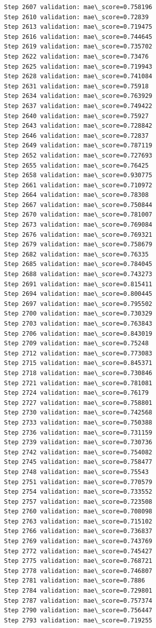 \documentclass[11pt]{article}
\begin{document}
\begin{Verbatim}[commandchars=\\\{\}]
Step 2607 validation: mae\_score=0.758196
Step 2610 validation: mae\_score=0.72839
Step 2613 validation: mae\_score=0.719475
Step 2616 validation: mae\_score=0.744645
Step 2619 validation: mae\_score=0.735702
Step 2622 validation: mae\_score=0.73476
Step 2625 validation: mae\_score=0.719943
Step 2628 validation: mae\_score=0.741084
Step 2631 validation: mae\_score=0.75918
Step 2634 validation: mae\_score=0.763929
Step 2637 validation: mae\_score=0.749422
Step 2640 validation: mae\_score=0.75927
Step 2643 validation: mae\_score=0.728842
Step 2646 validation: mae\_score=0.72837
Step 2649 validation: mae\_score=0.787119
Step 2652 validation: mae\_score=0.727693
Step 2655 validation: mae\_score=0.76425
Step 2658 validation: mae\_score=0.930775
Step 2661 validation: mae\_score=0.710972
Step 2664 validation: mae\_score=0.78308
Step 2667 validation: mae\_score=0.750844
Step 2670 validation: mae\_score=0.781007
Step 2673 validation: mae\_score=0.769084
Step 2676 validation: mae\_score=0.769321
Step 2679 validation: mae\_score=0.758679
Step 2682 validation: mae\_score=0.76335
Step 2685 validation: mae\_score=0.784045
Step 2688 validation: mae\_score=0.743273
Step 2691 validation: mae\_score=0.815411
Step 2694 validation: mae\_score=0.800445
Step 2697 validation: mae\_score=0.795502
Step 2700 validation: mae\_score=0.730329
Step 2703 validation: mae\_score=0.763843
Step 2706 validation: mae\_score=0.843019
Step 2709 validation: mae\_score=0.75248
Step 2712 validation: mae\_score=0.773083
Step 2715 validation: mae\_score=0.845371
Step 2718 validation: mae\_score=0.730846
Step 2721 validation: mae\_score=0.781081
Step 2724 validation: mae\_score=0.76179
Step 2727 validation: mae\_score=0.758801
Step 2730 validation: mae\_score=0.742568
Step 2733 validation: mae\_score=0.750388
Step 2736 validation: mae\_score=0.731159
Step 2739 validation: mae\_score=0.730736
Step 2742 validation: mae\_score=0.754082
Step 2745 validation: mae\_score=0.758477
Step 2748 validation: mae\_score=0.75543
Step 2751 validation: mae\_score=0.770579
Step 2754 validation: mae\_score=0.733552
Step 2757 validation: mae\_score=0.723508
Step 2760 validation: mae\_score=0.708098
Step 2763 validation: mae\_score=0.715102
Step 2766 validation: mae\_score=0.736837
Step 2769 validation: mae\_score=0.743769
Step 2772 validation: mae\_score=0.745427
Step 2775 validation: mae\_score=0.768721
Step 2778 validation: mae\_score=0.746807
Step 2781 validation: mae\_score=0.7886
Step 2784 validation: mae\_score=0.729801
Step 2787 validation: mae\_score=0.757374
Step 2790 validation: mae\_score=0.756447
Step 2793 validation: mae\_score=0.719255

\end{Verbatim}
\end{document}
